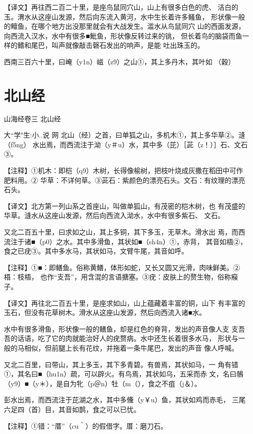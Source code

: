 \documentclass[a4paper,12pt,UTF8,twoside]{ctexbook}
\begin{document}
【译文】再往西二百二十里，是座鸟鼠同穴山，山上有很多白色的虎、 洁白的玉。渭水从这座山发源，然后向东流入黄河，水中生长着许多鳋鱼， 形状像一般的鳣鱼，在哪个地方出没那里就会有大战发生。滥水从鸟鼠同穴 山的西面发源，向西流入汉水，水中有很多■魮鱼，形状像反转过来的铫， 但长着鸟的脑袋而鱼一样的鳍和尾巴，叫声就像敲击磬石发出的响声，是能 吐出珠玉的。

西南三百六十里，曰崦（y1n）嵫（z9）之山①，其上多丹木，其叶如 （穀）

\chapter{北山经}

山海经卷三 北山经

大``学"生:小..说 网
北山（经）之首，曰单狐之山，多机木①，其上多华草②。漨（f5ng） 水出焉，而西流注于泑（y＃u）水，其中多（芘）［茈（z！）］石、文石③。

【注释】①机木：即桤（q9）木树，长得像榆树，把枝叶烧成灰撒在稻田中可作肥料用。② 华草：不详何草。③茈石：紫颜色的漂亮石头。文石：有纹理的漂亮石头。

【译文】北方第一列山系之首座山，叫做单狐山，有茂密的桤木树，也 有茂盛的华草。漨水从这座山发源，然后向西流入泑水，水中有很多紫石、 文石。

又北二百五十里，曰求如之山，其上多铜，其下多玉，无草木。滑水出 焉，而西流注于诸■（p0）之水。其中多滑鱼，其状如■（sh4n）①，赤背， 其音如梧②，食之已疣③。其中多水马，其状如马，文臂牛尾，其音如呼。

【注释】①■：即鳝鱼。俗称黄鳝，体形如蛇，又长又圆又光滑，肉味鲜美。②梧：枝梧， 也作“支吾”，用含混的言语搪塞。③疣：皮肤上的赘生物，俗称瘊子。

【译文】再往北二百五十里，是座求如山，山上蕴藏着丰富的铜，山下 有丰富的玉石，但没有花草树木。滑水从这座山发源，然后向西流入诸■水。

水中有很多滑鱼，形状像一般的鳝鱼，却是红色的脊背，发出的声音像人支 支吾吾的话语，吃了它的肉就能治好人的疣赘病。水中还生长着很多水马， 形状与一般的马相似，但前腿上长有花纹，并拖着一条牛尾巴，发出的声音 像人呼喊。

又北二百里，曰带山，其上多玉，其下多青碧。有兽焉，其状如马，一 角有错①，其名曰■（hu1n）疏，可以辟火。有鸟焉，其状如乌，五采而赤 文，名曰鵸（y9）■（y＊），是自为牝（p＠n）牡（m（），食之不疽（j＆）。

彭水出焉，而西流注于芘湖之水，其中多儵（y￥u）鱼，其状如鸡而赤毛， 三尾六足四（首）目，其音如鹊，食之可以已忧。

【注释】①错：“厝”（cu＾）的假借字。厝：磨刀石。
\end{document}
